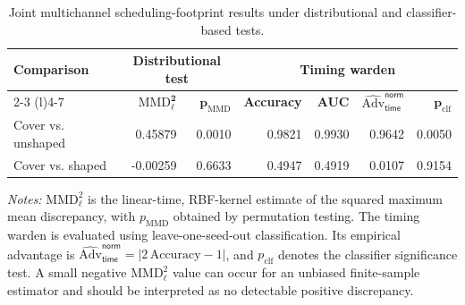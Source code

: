 \documentclass[journal]{IEEEtran}
\renewcommand{\arraystretch}{1.2}
\renewcommand{\arraystretch}{1.0}
\theoremstyle{definition}
\theoremstyle{game}
\renewcommand{\arraystretch}{1.5}
\begin{document}
\begin{table}[!t]
\centering
\caption[Joint multichannel scheduling-footprint results.]
{Joint multichannel scheduling-footprint results under distributional and classifier-based tests.}
\label{tab:scheduling_joint}
\small
\setlength{\tabcolsep}{5.0pt}
\renewcommand{\arraystretch}{1.15}
\begin{threeparttable}
\begin{tabular}{@{}lrrrrrr@{}}
\toprule
\textbf{Comparison} &
\multicolumn{2}{c}{\textbf{Distributional test}} &
\multicolumn{4}{c}{\textbf{Timing warden}} \\
\cmidrule(lr){2-3}
\cmidrule(l){4-7}
& $\boldsymbol{\mathrm{MMD}^{2}_{\ell}}$
& $\boldsymbol{p_{\mathrm{MMD}}}$
& \textbf{Accuracy}
& \textbf{AUC}
& $\boldsymbol{\widehat{\mathrm{Adv}}_{\mathsf{time}}^{\mathsf{norm}}}$
& $\boldsymbol{p_{\mathrm{clf}}}$ \\
\midrule
Cover vs. unshaped &  0.45879 & 0.0010 & 0.9821 & 0.9930 & 0.9642 & 0.0050 \\
Cover vs. shaped   & -0.00259 & 0.6633 & 0.4947 & 0.4919 & 0.0107 & 0.9154 \\
\bottomrule
\end{tabular}
\begin{tablenotes}
\footnotesize
\item \textit{Notes:} $\mathrm{MMD}^{2}_{\ell}$ is the linear-time, RBF-kernel estimate of the squared maximum mean discrepancy, with $p_{\mathrm{MMD}}$ obtained by permutation testing. The timing warden is evaluated using leave-one-seed-out classification. Its empirical advantage is $\widehat{\mathrm{Adv}}_{\mathsf{time}}^{\mathsf{norm}}=|2\,\mathrm{Accuracy}-1|$, and $p_{\mathrm{clf}}$ denotes the classifier significance test. A small negative $\mathrm{MMD}^{2}_{\ell}$ value can occur for an unbiased finite-sample estimator and should be interpreted as no detectable positive discrepancy.
\end{tablenotes}
\end{threeparttable}
\end{table}
\end{document}
